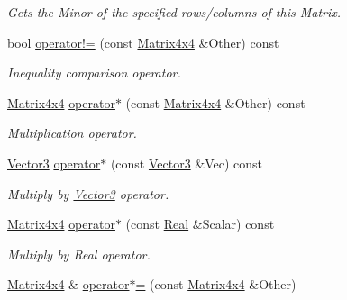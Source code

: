 \begin{DoxyCompactItemize}
\begin{DoxyCompactList}\small\item\em Gets the Minor of the specified rows/columns of this Matrix. \item\end{DoxyCompactList}\item 
bool \hyperlink{classMezzanine_1_1Matrix4x4_aa8b51da721cbf89db3d0b7b5354179f7}{operator!=} (const \hyperlink{classMezzanine_1_1Matrix4x4}{Matrix4x4} \&Other) const 
\begin{DoxyCompactList}\small\item\em Inequality comparison operator. \item\end{DoxyCompactList}\item 
\hyperlink{classMezzanine_1_1Matrix4x4}{Matrix4x4} \hyperlink{classMezzanine_1_1Matrix4x4_ab52300faa884768232f4e89ffa78e2fe}{operator$\ast$} (const \hyperlink{classMezzanine_1_1Matrix4x4}{Matrix4x4} \&Other) const 
\begin{DoxyCompactList}\small\item\em Multiplication operator. \item\end{DoxyCompactList}\item 
\hyperlink{classMezzanine_1_1Vector3}{Vector3} \hyperlink{classMezzanine_1_1Matrix4x4_a69dad38dd4608baa6649948e0b839a97}{operator$\ast$} (const \hyperlink{classMezzanine_1_1Vector3}{Vector3} \&Vec) const 
\begin{DoxyCompactList}\small\item\em Multiply by \hyperlink{classMezzanine_1_1Vector3}{Vector3} operator. \item\end{DoxyCompactList}\item 
\hyperlink{classMezzanine_1_1Matrix4x4}{Matrix4x4} \hyperlink{classMezzanine_1_1Matrix4x4_aff669e1db622c1727a4683cd43713337}{operator$\ast$} (const \hyperlink{namespaceMezzanine_a726731b1a7df72bf3583e4a97282c6f6}{Real} \&Scalar) const 
\begin{DoxyCompactList}\small\item\em Multiply by Real operator. \item\end{DoxyCompactList}\item 
\hyperlink{classMezzanine_1_1Matrix4x4}{Matrix4x4} \& \hyperlink{classMezzanine_1_1Matrix4x4_a139e94d0b0b0ca7958253c338a3835b0}{operator$\ast$=} (const \hyperlink{classMezzanine_1_1Matrix4x4}{Matrix4x4} \&Other)

\end{DoxyCompactItemize}

